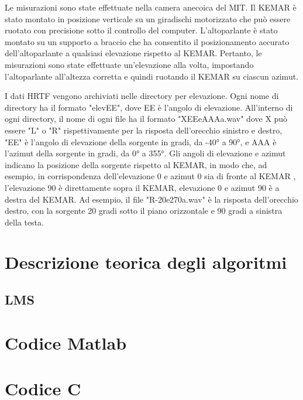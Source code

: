 \documentclass[12pt,a4paper,titlepage]{article}
\begin{document}
Le misurazioni sono state effettuate nella camera anecoica del MIT. Il KEMAR è stato montato in posizione verticale su un giradischi motorizzato che può essere ruotato con precisione sotto il controllo del computer. L'altoparlante è stato montato su un supporto a braccio che ha consentito il posizionamento accurato dell'altoparlante a qualsiasi elevazione rispetto al KEMAR. Pertanto, le misurazioni sono state effettuate un'elevazione alla volta, impostando l'altoparlante all'altezza corretta e quindi ruotando il KEMAR su ciascun azimut.

I dati HRTF vengono archiviati nelle directory per elevazione. Ogni nome di directory ha il formato "elevEE", dove EE è l'angolo di elevazione. All'interno di ogni directory, il nome di ogni file ha il formato "XEEeAAAa.wav" dove X può essere "L" o "R" rispettivamente per la risposta dell'orecchio sinistro e destro, "EE" è l'angolo di elevazione della sorgente in gradi, da -40° a 90°, e AAA è l'azimut della sorgente in gradi, da 0° a 355°. Gli angoli di elevazione e azimut indicano la posizione della sorgente rispetto al KEMAR, in modo che, ad esempio, in corrispondenza dell'elevazione 0 e azimut 0 sia di fronte al KEMAR , l'elevazione 90 è direttamente sopra il KEMAR, elevazione 0 e azimut 90 è a destra del KEMAR. Ad esempio, il file "R-20e270a.wav" è la risposta dell'orecchio destro, con la sorgente 20 gradi sotto il piano orizzontale e 90 gradi a sinistra della testa.

\section{Descrizione teorica degli algoritmi}
\subsection{LMS}

\section{Codice Matlab}

\section{Codice C}

\clearpage

\nocite{*}
\printbibliography
\end{document}
